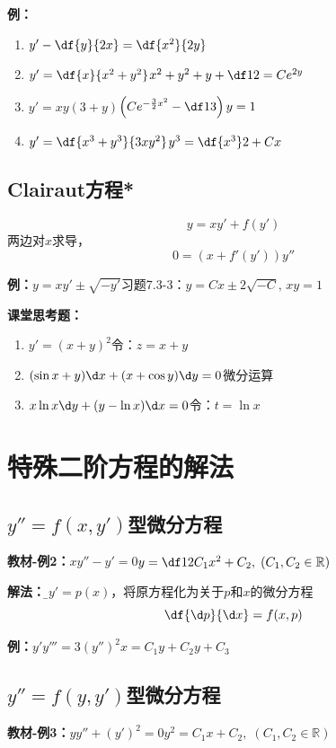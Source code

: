 {\bf 例：}
\begin{enumerate}[(1)]
  \setlength{\itemindent}{1cm}
  \item $y'-\df{y}{2x}=\df{x^2}{2y}$
  \item $y'=\df{x}{x^2+y^2}$\hfill$x^2+y^2+y+\df12=Ce^{2y}$
  \item $y'=xy(3+y)$\hfill$\left(Ce^{-\frac32x^2}-\df13\right)y=1$
  \item $y'=\df{x^3+y^3}{3xy^2}$\hfill$y^3=\df{x^3}2+Cx$
\end{enumerate}

\subsection{Clairaut方程*}
$$y=xy'+f(y')$$
两边对$x$求导，
$$0=(x+f'(y'))y''$$

{\bf 例：}$y=xy'\pm\sqrt{-y'}$\hfill 习题7.3-3：$y=Cx\pm2\sqrt{-C},\,xy=1$

\bigskip

{\bf 课堂思考题：}
\begin{enumerate}[(1)]
  \setlength{\itemindent}{1cm}
  \item $y'=(x+y)^2$\hfill 令：$z=x+y$
  \item $(\sin x+y)\d x+(x+\cos y)\d y=0$\hfill 微分运算
  \item $x\ln x\d y+(y-\ln x)\d x=0$\hfill 令：$t=\ln x$
\end{enumerate}

\section{特殊二阶方程的解法}

\subsection{$y''=f(x,y')$型微分方程}

{\bf 教材-例2：}$xy''-y'=0$\hfill $y=\df12C_1x^2+C_2,\;(C_1,C_2\in\mathbb{R})$

{\bf 解法：}{\b 令$y'=p(x)$，将原方程化为关于$p$和$x$的微分方程
$$\df{\d p}{\d x}=f(x,p)$$
}

{\bf 例：}$y'y'''=3(y'')^2$\hfill $x=C_1y+C_2y+C_3$

\subsection{$y''=f(y,y')$型微分方程}

{\bf 教材-例3：}$yy''+(y')^2=0$\hfill $y^2=C_1x+C_2,\;(C_1,C_2\in\mathbb{R})$

